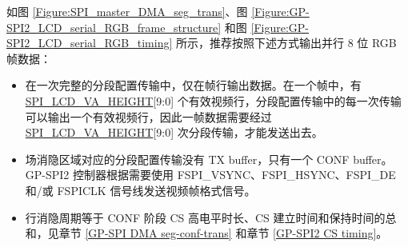 \documentclass[main\_\_CN.tex]{subfiles}
\begin{document}
如图 \ref{Figure:SPI_master_DMA_seg_trans}、图 \ref{Figure:GP-SPI2_LCD_serial_RGB_frame_structure} 和图 \ref{Figure:GP-SPI2_LCD_serial_RGB_timing} 所示，推荐按照下述方式输出并行 8 位 RGB 帧数据：
    \begin{itemize}
        \item 在一次完整的分段配置传输中，仅在帧行输出数据。在一个帧中，有 \hyperref[fielddesc:SPILCDVAHEIGHT]{SPI\_LCD\_VA\_HEIGHT}[9:0] 个有效视频行，分段配置传输中的每一次传输可以输出一个有效视频行，因此一帧数据需要经过 \hyperref[fielddesc:SPILCDVAHEIGHT]{SPI\_LCD\_VA\_HEIGHT}[9:0] 次分段传输，才能发送出去。

        \item 场消隐区域对应的分段配置传输没有 TX buffer，只有一个 CONF buffer。GP-SPI2 控制器根据需要使用 FSPI\_VSYNC、FSPI\_HSYNC、FSPI\_DE 和/或 FSPICLK 信号线发送视频帧格式信号。
        \item 行消隐周期等于 CONF 阶段 CS 高电平时长、CS 建立时间和保持时间的总和，见章节 \ref{GP-SPI DMA seg-conf-trans} 和章节 \ref{GP-SPI2 CS timing}。
    \end{itemize}
\end{document}
